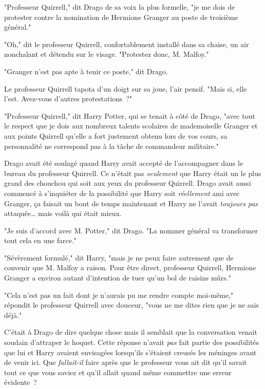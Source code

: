 \later

"Professeur Quirrell," dit Drago de sa voix la plus formelle, "je me dois de protester contre la nomination de Hermione Granger au poste de troisième général."

"Oh," dit le professeur Quirrell, confortablement installé dans sa chaise, un air nonchalant et détendu sur le visage. "Protestez donc, M. Malfoy."

"Granger n'est pas apte à tenir ce poste," dit Drago.

Le professeur Quirrell tapota d'un doigt sur sa joue, l'air pensif. "Mais si, elle l'est. Avez-vous d'autres protestations~?"

"Professeur Quirrell," dit Harry Potter, qui se tenait à côté de Drago, "avec tout le respect que je dois aux nombreux talents scolaires de mademoiselle Granger et aux points Quirrell qu'elle a fort justement obtenu lors de vos cours, sa personnalité ne correspond pas à la tâche de commandeur militaire."

Drago avait été soulagé quand Harry avait accepté de l'accompagner dans le bureau du professeur Quirrell. Ce n'était pas \emph{seulement} que Harry était un le plus grand des chouchou qui soit aux yeux du professeur Quirrell. Drago avait aussi commencé à s'inquiéter de la possibilité que Harry soit \emph{réellement} ami avec Granger, ça faisait un bout de temps maintenant et Harry ne l'avait \emph{toujours pas} attaquée… mais voilà qui était mieux.

"Je suis d'accord avec M. Potter," dit Drago. "La nommer général va transformer tout cela en une farce."

"Sévèrement formulé," dit Harry, "mais je ne peux faire autrement que de convenir que M. Malfoy a raison. Pour être direct, professeur Quirrell, Hermione Granger a environ autant d'intention de tuer qu'un bol de raisins mûrs."

"Cela n'est pas un fait dont je n'aurais pu me rendre compte moi-même," répondit le professeur Quirrell avec douceur, "vous ne me dites rien que je ne sais déjà."

C'était à Drago de dire quelque chose mais il semblait que la conversation venait soudain d'attraper le hoquet. Cette réponse n'avait \emph{pas} fait partie des possibilités que lui et Harry avaient envisagées lorsqu'ils s'étaient creusés les méninges avant de venir ici. Que \emph{fallait-il} faire après que le professeur vous ait dit qu'il savait tout ce que vous saviez et qu'il allait quand même commettre une erreur évidente~?


